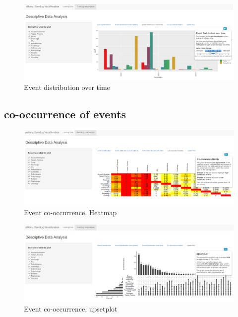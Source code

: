 \documentclass[
]{book}
\begin{document}
\begin{figure}
\centering
\includegraphics[width=1\textwidth,height=\textheight]{images/Visualizzazione2.png}
\caption{Event distribution over time}
\end{figure}

\hypertarget{co-occurrence-of-events}{%
\subsection{co-occurrence of events}\label{co-occurrence-of-events}}

\begin{figure}
\centering
\includegraphics[width=1\textwidth,height=\textheight]{images/Visualizzazione3.png}
\caption{Event co-occurrence, Heatmap}
\end{figure}

\begin{figure}
\centering
\includegraphics[width=1\textwidth,height=\textheight]{images/Visualizzazione4.png}
\caption{Event co-occurrence, upsetplot}
\end{figure}
\end{document}
